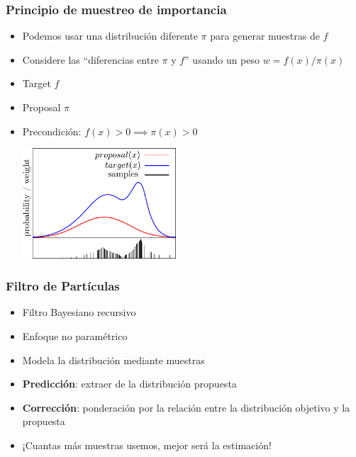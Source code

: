 \begin{frame}
    \frametitle{Principio de muestreo de importancia}

    \begin{itemize}
        \item Podemos usar una distribución diferente $\pi$ para generar muestras de $f$
        \item Considere las ``diferencias entre $\pi$ y $f$'' usando un peso $w = f(x) / \pi(x)$
        \item Target $f$
        \item Proposal $\pi$
        \item Precondición:
        $f(x) > 0 \implies \pi(x) > 0$
        \begin{center}
        \includegraphics[width=0.45\textwidth]{./images/particle_filter/importance_sampling_principle.pdf}
        \end{center}
    \end{itemize}
\end{frame}
    
\begin{frame}
    \frametitle{Filtro de Partículas}

    \begin{itemize}
        \item Filtro Bayesiano recursivo
        \item Enfoque no paramétrico
        \item Modela la distribución mediante muestras
        \item \textbf{Predicción}: extraer de la distribución propuesta
        \item \textbf{Corrección}: ponderación por la relación entre la distribución objetivo y la propuesta
        \item \alert{¡Cuantas más muestras usemos, mejor será la estimación!}
    \end{itemize}
\end{frame}
    
